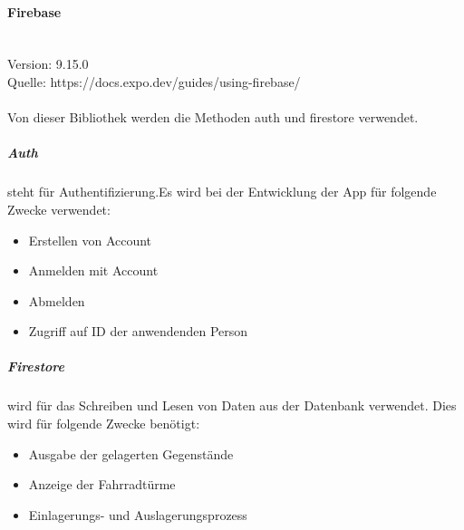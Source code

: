 \paragraph{Firebase}\mbox{}\\
Version: 9.15.0\\
Quelle: https://docs.expo.dev/guides/using-firebase/\\ \\
Von dieser Bibliothek werden die Methoden auth und firestore verwendet.\\
\subparagraph{Auth}steht für Authentifizierung.Es wird bei der Entwicklung der App für folgende Zwecke verwendet: 
\begin{itemize}
    \item Erstellen von Account
    \item Anmelden mit Account
    \item Abmelden
    \item Zugriff auf ID der anwendenden Person
\end{itemize}

\subparagraph{Firestore}wird für das Schreiben und Lesen von Daten aus der Datenbank verwendet. Dies wird für folgende Zwecke benötigt:
\begin{itemize}
    \item Ausgabe der gelagerten Gegenstände
    \item Anzeige der Fahrradtürme
    \item Einlagerungs- und Auslagerungsprozess
\end{itemize}

